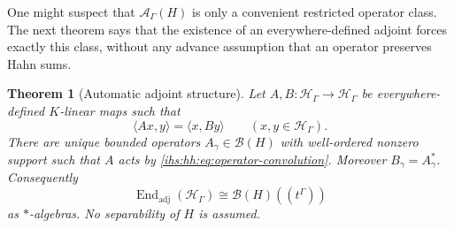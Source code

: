 \documentclass[11pt,a4paper]{article}
\numberwithin{equation}{section}
\newtheorem{theorem}{Theorem}[section]
\theoremstyle{definition}
\theoremstyle{remark}
\newcommand{\K}{K}
\newcommand{\Hil}{\mathcal H_\Gamma}
\newcommand{\B}{\mathcal B(H)}
\newcommand{\Ahh}{\mathcal A_\Gamma(H)}
\newcommand{\End}{\operatorname{End}}
\newcommand{\ip}[2]{\langle#1,#2\rangle}
\begin{document}
One might suspect that $\Ahh$ is only a convenient restricted operator
class. The next theorem says that the existence of an everywhere-defined
adjoint forces exactly this class, without any advance assumption that an
operator preserves Hahn sums.

\begin{theorem}[Automatic adjoint structure]\label{ihs:hh:thm:adjoint}
Let $A,B:\Hil\to\Hil$ be everywhere-defined $\K$-linear maps such that
\begin{equation}\label{ihs:hh:eq:adjoint-condition}
 \ip{Ax}{y}=\ip{x}{By}\qquad(x,y\in\Hil).
\end{equation}
There are unique bounded operators $A_\gamma\in\B$ with well-ordered
nonzero support such that $A$ acts by
\eqref{ihs:hh:eq:operator-convolution}. Moreover $B_\gamma=A_\gamma^*$.
Consequently
\[
 \End_{\mathrm{adj}}(\Hil)\cong\B((t^\Gamma))
\]
as $*$-algebras. No separability of $H$ is assumed.
\end{theorem}
\end{document}
